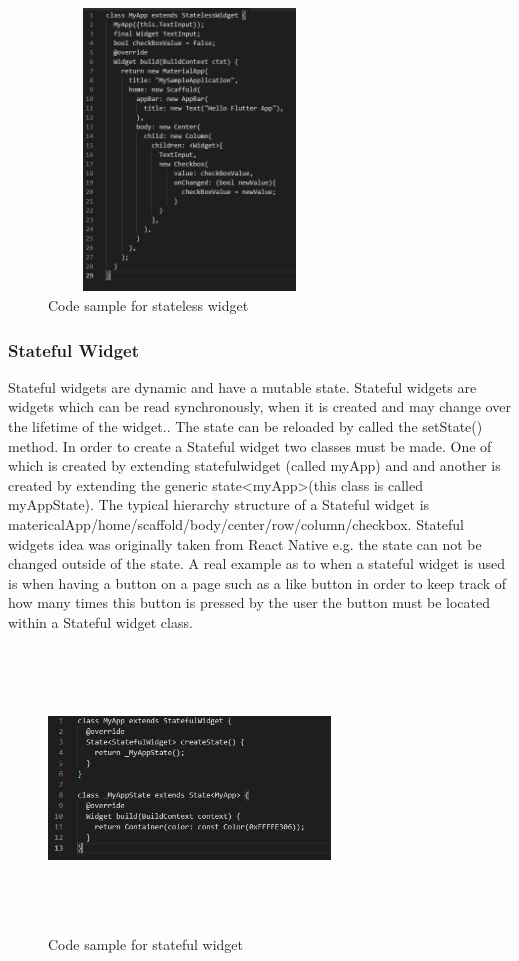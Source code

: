 \begin{figure}[ht!]
    \centering
 \includegraphics[width=75mm, height=75mm,scale=0.5]{img/stateless.PNG}
\caption{Code sample for stateless widget}
\label{fig:stateless}
\end{figure}

\subsubsection{Stateful Widget}
Stateful widgets are dynamic and have a mutable state. Stateful widgets are widgets which can be read synchronously, when it is created and may change over the lifetime of the widget.\cite{stateful_widgets_2018}. The state can be reloaded by called the setState() method. In order to create a Stateful widget two classes must be made. One of which is created by extending statefulwidget (called myApp) and and another is created by extending the generic state<myApp>(this class is called myAppState). The typical hierarchy structure of a Stateful widget is matericalApp/home/scaffold/body/center/row/column/checkbox.\cite{widgets} \cite{stateful} Stateful widgets idea was originally taken from React Native e.g. the state can not  be changed outside of the state. A real example as to when a stateful widget is used is when having a button on a page such as a like button in order to keep track of how many times this button is pressed by the user the button must be located within a Stateful widget class. \cite{choudhary_2019}


\begin{figure}[ht!]
    \centering
 \includegraphics[width=75mm, height=75mm,scale=0.5]{img/stateful.PNG}
\caption{Code sample for stateful widget}
\label{fig:stateful}
\end{figure}

